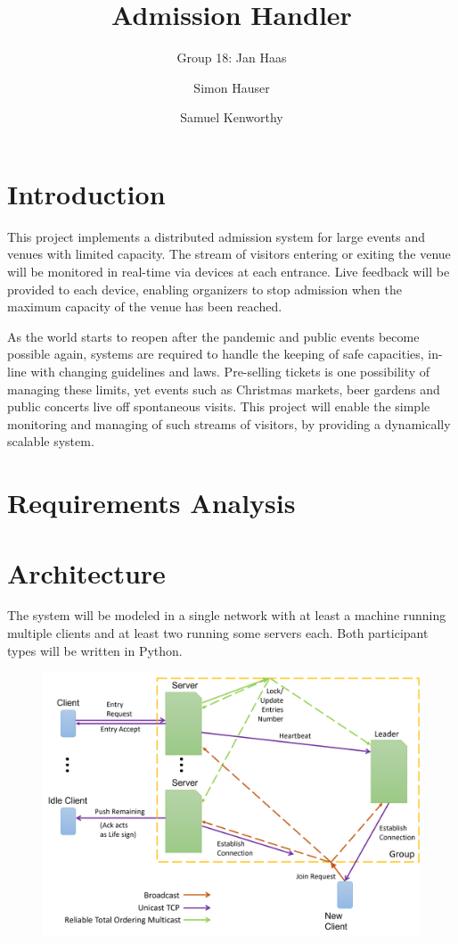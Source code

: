 \documentclass[runningheads]{llncs}
\begin{document}
%
\title{Admission Handler}

\author{Group 18: Jan Haas \and Simon Hauser \and Samuel Kenworthy}

\institute{}
%
\maketitle              %

\section{Introduction}
This project implements a distributed admission system for large events and venues with limited capacity.
The stream of visitors entering or exiting the venue will be monitored in real-time via devices at each entrance.
Live feedback will be provided to each device, enabling organizers to stop admission when the maximum capacity of the venue has been reached.

As the world starts to reopen after the pandemic and public events become possible again, systems are required to handle the keeping of safe capacities, in-line with changing guidelines and laws.
Pre-selling tickets is one possibility of managing these limits, yet events such as Christmas markets, beer gardens and public concerts live off spontaneous visits.
This project will enable the simple monitoring and managing of such streams of visitors, by providing a dynamically scalable system.

\section{Requirements Analysis}



\section{Architecture}
The system will be modeled in a single network with at least a machine running multiple clients and at least two running some servers each.
Both participant types will be written in Python.\\
\begin{figure}
\includegraphics[width=\textwidth]{Architecture_Diagram.png}
\end{figure}
\end{document}
